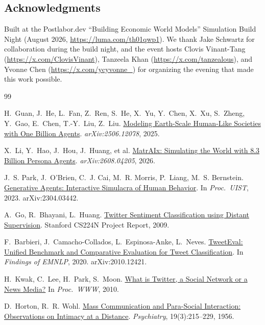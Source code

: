 \documentclass[twocolumn,10pt]{article}
\makeatletter
\newcommand{\paperurlof}[1]{\csname paperurl@#1\endcsname}
\newcommand{\reftitle}[2]{\href{\paperurlof{#1}}{#2}}
\makeatother
\begin{document}
\subsection*{Acknowledgments}
Built at the Postlabor.dev ``Building Economic World Models'' Simulation Build
Night (August 2026, \url{https://luma.com/th01qwp1}). We thank Jake Schwartz
for collaboration during the build
night, and the event hosts
Clovis Vinant-Tang (\url{https://x.com/ClovisVinant}),
Tanzeela Khan (\url{https://x.com/tanzealous}), and
Yvonne Chen (\url{https://x.com/ycyvonne_})
for organizing the evening that made this work possible.



\begin{thebibliography}{99}\small

H.~Guan, J.~He, L.~Fan, Z.~Ren, S.~He, X.~Yu, Y.~Chen, X.~Xu, S.~Zheng,
Y.~Gao, E.~Chen, T.-Y.~Liu, Z.~Liu.
\newblock \reftitle{lightsociety}{Modeling Earth-Scale
Human-Like Societies with One Billion Agents}.
\newblock \emph{arXiv:2506.12078}, 2025.

X.~Li, Y.~Hao, J.~Hou, J.~Huang, et al.
\newblock \reftitle{matraix}{MatrAIx: Simulating the
World with 8.3 Billion Persona Agents}.
\newblock \emph{arXiv:2608.04205}, 2026.

J.~S. Park, J.~O'Brien, C.~J. Cai, M.~R. Morris, P.~Liang, M.~S. Bernstein.
\newblock \reftitle{park2023}{Generative Agents:
Interactive Simulacra of Human Behavior}.
\newblock In \emph{Proc.\ UIST}, 2023. arXiv:2304.03442.

A.~Go, R.~Bhayani, L.~Huang.
\newblock \reftitle{sentiment140}{Twitter
Sentiment Classification using Distant Supervision}.
\newblock Stanford CS224N Project Report, 2009.

F.~Barbieri, J.~Camacho-Collados, L.~Espinosa-Anke, L.~Neves.
\newblock \reftitle{tweeteval}{TweetEval:
Unified Benchmark and Comparative Evaluation for Tweet Classification}.
\newblock In \emph{Findings of EMNLP}, 2020. arXiv:2010.12421.

H.~Kwak, C.~Lee, H.~Park, S.~Moon.
\newblock \reftitle{kwak2010}{What
is Twitter, a Social Network or a News Media?}
\newblock In \emph{Proc.\ WWW}, 2010.

D.~Horton, R.~R. Wohl.
\newblock \reftitle{horton1956}{Mass
Communication and Para-Social Interaction: Observations on Intimacy at a
Distance}.
\newblock \emph{Psychiatry}, 19(3):215--229, 1956.


\end{thebibliography}
\end{document}
